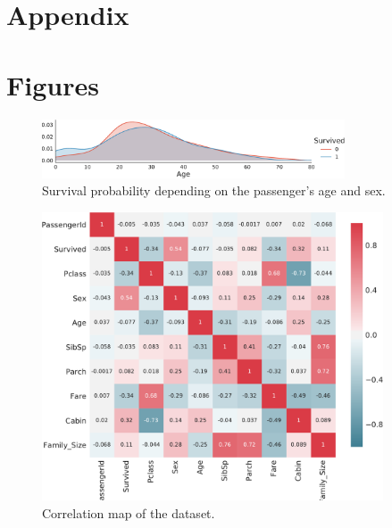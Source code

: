 \section*{Appendix}
\section{Figures}
 \begin{figure}[h]
 \centering
     \includegraphics[width=0.8\textwidth]{media_saved/age_all}
     \caption{Survival probability depending on the passenger's age and sex.}
     \label{fig:agesexfeat}
\end{figure}
\begin{figure}[h]
\centering
\includegraphics[width=0.9\textwidth]{media_saved/correlation_map}
     \caption{Correlation map of the dataset.}
     \label{fig:correlationmap}
\end{figure}

\newpage
